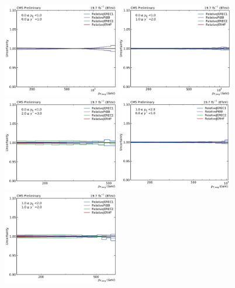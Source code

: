 \begin{figure}[htbp]
    \centering
    \includegraphics[width=0.45\textwidth]{figures/measurement/jec_relunc_2_yb0ys0.pdf}\hfill
    \includegraphics[width=0.45\textwidth]{figures/measurement/jec_relunc_2_yb0ys1.pdf}
    \includegraphics[width=0.45\textwidth]{figures/measurement/jec_relunc_2_yb0ys2.pdf}\hfill
    \includegraphics[width=0.45\textwidth]{figures/measurement/jec_relunc_2_yb1ys0.pdf}
    \includegraphics[width=0.45\textwidth]{figures/measurement/jec_relunc_2_yb1ys1.pdf}\hfill

\end{figure}
